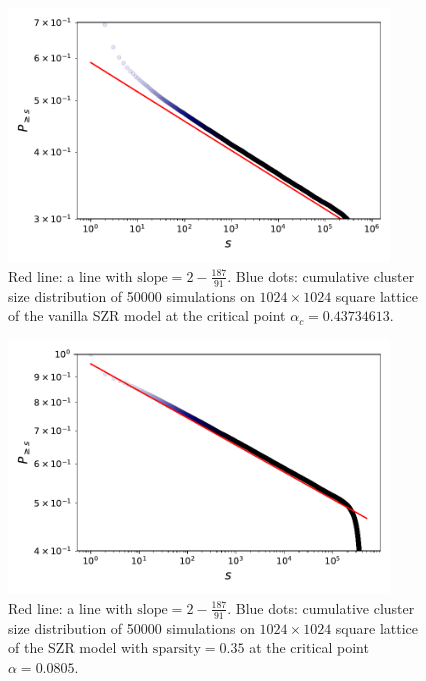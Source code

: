 \documentclass[11pt]{article}
\begin{document}
\begin{figure}[H]
    \centering
    \includegraphics[width=0.9\textwidth]{fig/P_geq_s_50000_1024.pdf}
    \caption{Red line: a line with $\text{slope} = 2 - \frac{187}{91}$. Blue dots: cumulative cluster size distribution of 50000 simulations on $1024 \times 1024$ square lattice of the vanilla SZR model at the critical point $\alpha_{c} = 0.43734613$.\cite{Zombies}}
    \label{fig:p-geq-s-50000-1024}
\end{figure}

\begin{figure}[H]
    \centering
    \includegraphics[width=0.9\textwidth]{fig/P_geq_s_alpha0.35.pdf}
    \caption{Red line: a line with $\text{slope} = 2 - \frac{187}{91}$. Blue dots: cumulative cluster size distribution of 50000 simulations on $1024 \times 1024$ square lattice of the SZR model with $\text{sparsity} = 0.35$ at the critical point $\alpha = 0.0805$.}
    \label{fig:p-geq-s-0.35}
\end{figure}
\end{document}
